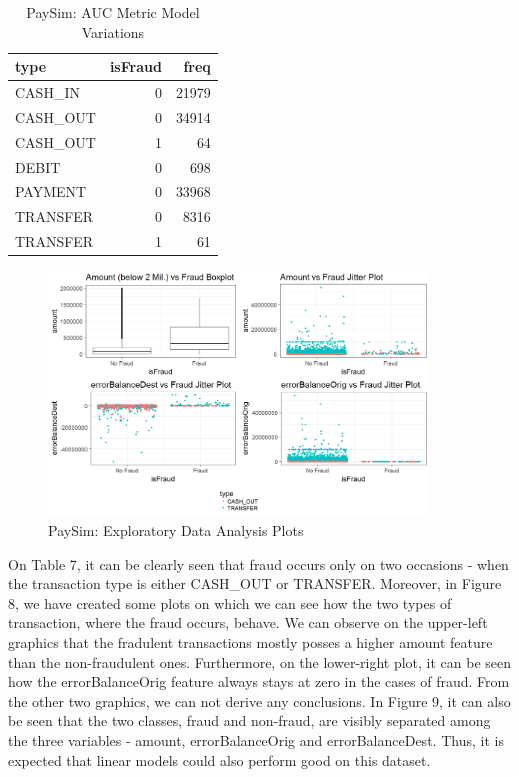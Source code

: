 \documentclass[12pt,]{article}
\begin{document}
\begin{table}

\caption{\label{tab:paySim_fraud_types}PaySim: AUC Metric Model Variations}
\centering
\fontsize{8}{10}\selectfont
\begin{tabular}[t]{lrr}
\toprule
type & isFraud & freq\\
\midrule
CASH\_IN & 0 & 21979\\
CASH\_OUT & 0 & 34914\\
CASH\_OUT & 1 & 64\\
DEBIT & 0 & 698\\
PAYMENT & 0 & 33968\\
\addlinespace
TRANSFER & 0 & 8316\\
TRANSFER & 1 & 61\\
\bottomrule
\end{tabular}
\end{table}

\begin{figure}
\centering
\includegraphics[width=0.9\textwidth,height=\textheight]{figures/paySim/descriptive/four_plots.png}
\caption{PaySim: Exploratory Data Analysis Plots}
\end{figure}

On Table 7, it can be clearly seen that fraud occurs only on two
occasions - when the transaction type is either CASH\_OUT or TRANSFER.
Moreover, in Figure 8, we have created some plots on which we can see
how the two types of transaction, where the fraud occurs, behave. We can
observe on the upper-left graphics that the fradulent transactions
mostly posses a higher amount feature than the non-fraudulent ones.
Furthermore, on the lower-right plot, it can be seen how the
errorBalanceOrig feature always stays at zero in the cases of fraud.
From the other two graphics, we can not derive any conclusions. In
Figure 9, it can also be seen that the two classes, fraud and non-fraud,
are visibly separated among the three variables - amount,
errorBalanceOrig and errorBalanceDest. Thus, it is expected that linear
models could also perform good on this dataset.
\end{document}
